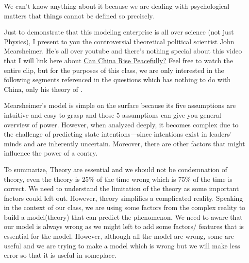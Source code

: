 \documentclass[12pt]{article}
\begin{document}
\begin{enumerate}
We can't know anything about it because we are dealing with psychological matters that things cannot be defined so precisely.

\vspace{1cm}

Just to demonstrate that this modeling enterprise is all over science (not just Physics), I present to you the controversial theoretical political scientist John Mearsheimer. He's all over youtube and there's nothing special about this video that I will link here about \href{https://www.youtube.com/watch?v=D_Mx_e8t7nU&t=4673s}{Can China Rise Peacefully?} Feel free to watch the entire clip, but for the purposes of this class, we are only interested in the following segments referenced in the questions which has nothing to do with China, only his theory of .

 

Mearsheimer’s model is simple on the surface because its five assumptions are intuitive and easy to grasp and those 5 assumptions can give you general overview of power. However, when analyzed deeply, it becomes complex due to the challenge of predicting state intentions—since intentions exist in leaders’ minds and are inherently uncertain. Moreover, there are other factors that might influence the power of a contry.



 

To summarize, Theory are essential and we should not be condemnation of theory, even the theory is 25\% of the time wrong which is 75\% of the time is correct. We need to understand the limitation of the theory as some important factors could left out. However, theory simplifies a complicated reality. Speaking in the context of our class, we are using some factors from the complex reality to build a model(theory) that can predict the phenomenon. We need to aware that our model is always wrong as we might left to add some factors/ features that is essential for the model. However, although all the model are wrong, some are useful and we are trying to make a model which is wrong but we will make less error so that it is useful in someplace.


\end{enumerate}
\end{document}
